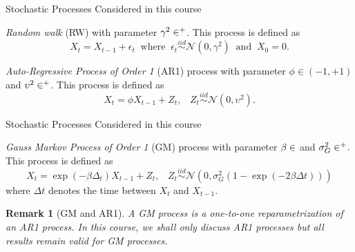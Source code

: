 \documentclass[envcountsect,usenames,dvipsnames]{beamer}
\def\simiid{\stackrel{iid}{\sim}}
\theoremstyle{mystyle}
\newtheorem{Remark}{Remark}
\begin{document}
\begin{frame}{Stochastic Processes Considered in this course}
\small

\begin{Definition}
     \emph{Random walk} (RW) with parameter $\gamma^2 \in \real^+$. This process is defined as
		\begin{equation*}
			X_t = X_{t-1} + \epsilon_t \;\; \text{where}\;\; \epsilon_t  \overset{iid}{\sim} \mathcal{N}\left(0, \gamma^2 \right)\;\; \text{and}\;\; X_0 = 0.
		\end{equation*}
		\label{def.RW}
\end{Definition}

\begin{Definition}
\emph{Auto-Regressive Process of Order 1} (AR1) process with parameter $\phi \in (-1, +1)$ and $\upsilon^2 \in \real^+$. This process is defined as
	\begin{equation*}
      X_t = \phi X_{t-1} + Z_t, \;\;\; Z_t \simiid \mathcal{N}(0,\upsilon^2).
	\end{equation*}
	\label{def.AR1}
\end{Definition}

\end{frame}



\begin{frame}{Stochastic Processes Considered in this course}
\small


\begin{Definition}
\label{def.GM}
\emph{Gauss Markov Process of Order 1} (GM) process with parameter $\beta \in \real$ and $\sigma_G^2 \in \real^+$. This process is defined as
	\begin{equation*}
      X_t = \exp(-\beta \Delta_t) X_{t-1} + Z_t, \;\;\; 
      Z_t \simiid \mathcal{N}(0,\sigma^2_{G}(1-\exp(-2\beta\Delta t)))
	\end{equation*}
	where $\Delta t$ denotes the time between $X_t$ and $X_{t-1}$.
\end{Definition}

\begin{Remark}[GM and AR1]
A GM process is a one-to-one reparametrization of an AR1 process. In this course, we shall only discuss AR1 processes but all results remain valid for GM processes.
\end{Remark}

\end{frame}
\end{document}
